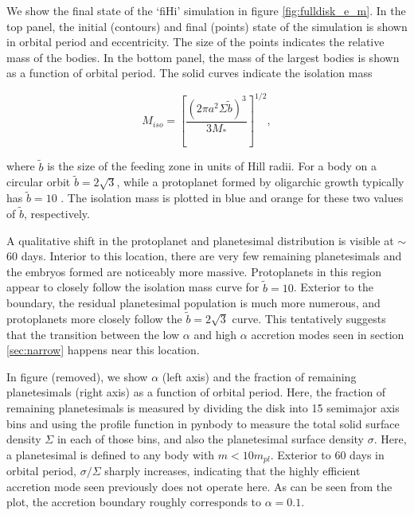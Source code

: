 \documentclass[twocolumn]{aastex63}
\begin{document}
We show the final state of the `fiHi' simulation in figure \ref{fig:fulldisk_e_m}. In the top panel, the initial (contours) and final (points) state of the simulation is shown in orbital period and eccentricity. The size of the points indicates the relative mass of the bodies. In the bottom panel, the mass of the largest bodies is shown as a function of orbital period. The solid curves indicate the isolation mass

\begin{equation}\label{eq:iso}
	M_{iso} = \left[ \frac{\left( 2 \pi a^2 \Sigma \tilde{b} \right)^3}{3 M_{*}} \right]^{1/2},
\end{equation}

\noindent where $\tilde{b}$ is the size of the feeding zone in units of Hill radii. For a body on a circular orbit $\tilde{b} = 2 \sqrt{3}$, while a protoplanet formed by oligarchic growth typically has $\tilde{b} = 10$ \citep{kokubo98}. The isolation mass is plotted in blue and orange for these two values of $\tilde{b}$, respectively.

A qualitative shift in the protoplanet and planetesimal distribution is visible at $\sim$ 60 days. Interior to this location, there are very few remaining planetesimals and the embryos formed are noticeably more massive. Protoplanets in this region appear to closely follow the isolation mass curve for $\tilde{b} = 10$. Exterior to the boundary, the residual planetesimal population is much more numerous, and protoplanets more closely follow the $\tilde{b} = 2 \sqrt{3}$ curve. This tentatively suggests that the transition between the low $\alpha$ and high $\alpha$ accretion modes seen in section \ref{sec:narrow} happens near this location.


In figure (removed), we show $\alpha$ (left axis) and the fraction of remaining planetesimals (right axis) as a function of orbital period. Here, the fraction of remaining planetesimals is measured by dividing the disk into 15 semimajor axis bins and using the profile function in {\sc pynbody} to measure the total solid surface density $\Sigma$ in each of those bins, and also the planetesimal surface density $\sigma$. Here, a planetesimal is defined to any body with $m < 10 m_{pl}$. Exterior to 60 days in orbital period, $\sigma/\Sigma$ sharply increases, indicating that the highly efficient accretion mode seen previously does not operate here. As can be seen from the plot, the accretion boundary roughly corresponds to $\alpha = 0.1$.
\end{document}
